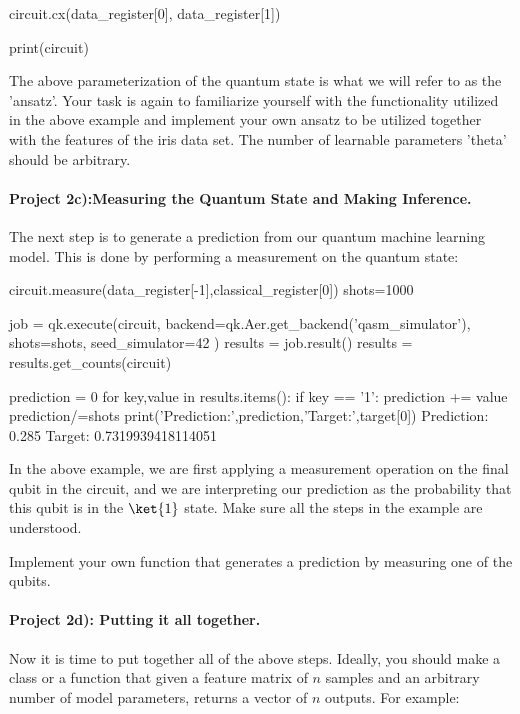 \documentclass[%
oneside,                 %
final,                   %
10pt]{article}
\begin{document}
circuit.cx(data_register[0], data_register[1])

print(circuit)
\epycod

The above parameterization of the quantum state is what we will refer
to as the 'ansatz'. Your task is again to familiarize yourself with
the functionality utilized in the above example and implement your own
ansatz to be utilized together with the features of the
iris data set. The number of learnable parameters 'theta'
should be arbitrary.



\paragraph{Project 2c):Measuring the Quantum State and Making Inference.}
The next step is to generate a prediction from our quantum machine learning model. This is done by performing a measurement on the quantum state:

\bpycod
circuit.measure(data_register[-1],classical_register[0])
shots=1000

job = qk.execute(circuit,
                backend=qk.Aer.get_backend('qasm_simulator'),
                shots=shots,
                seed_simulator=42
                )
results = job.result()
results = results.get_counts(circuit)

prediction = 0
for key,value in results.items():
    if key == '1':
        prediction += value
prediction/=shots
print('Prediction:',prediction,'Target:',target[0])
\epycod
\bpycod
    Prediction: 0.285 Target: 0.7319939418114051
\epycod

In the above example, we are first applying a measurement operation on
the final qubit in the circuit, and we are interpreting our prediction
as the probability that this qubit is in the $\ket{1}$ state. Make
sure all the steps in the example are understood.

Implement your own function that generates a prediction by measuring one of the qubits.



\paragraph{Project 2d): Putting it all together.}
Now it is time to put together all of the above steps. Ideally, you
should make a class or a function that given a feature matrix of $n$
samples and an arbitrary number of model parameters, returns a vector
of $n$ outputs. For example:
\end{document}
